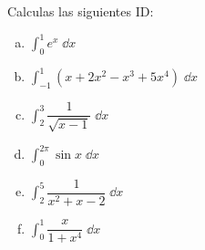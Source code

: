 \begin{ejre}
Calculas las siguientes ID:
\begin{multicols}{2}
\begin{enumerate}[a) ]
\item $\displaystyle \int_0^1 e^x \; \dd x$
\item $\displaystyle \int_{-1}^1 (x+2x^2-x^3+5x^4) \; \dd x$
\item $\displaystyle \int_2^3 \dfrac {1}{\sqrt{x-1}} \; \dd x$
\item $\displaystyle \int_0^{2\pi} \sin x \; \dd x$
\item $\displaystyle \int_2^5 \dfrac {1}{x^2+x-2} \; \dd x$	
\item $\displaystyle \int_0^1 \dfrac {x}{1+x^4} \; \dd x$
\end{enumerate}
\end{multicols}
\end{ejre}

